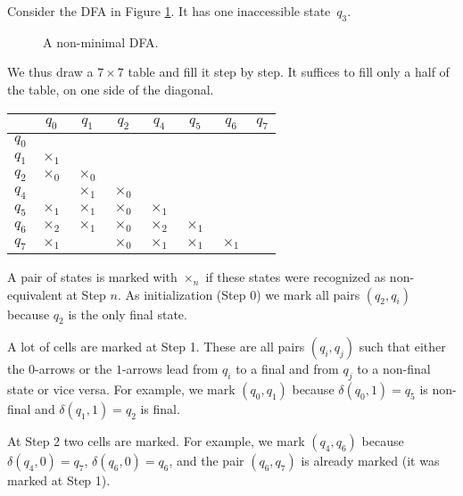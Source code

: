 \begin{exl}
Consider the DFA in Figure \ref{fig:DFAMinim}.
It has one inaccessible state~$q_3$.

\begin{figure}[ht]
\begin{center}

\end{center}
\caption{A non-minimal DFA.}
\label{fig:DFAMinim}
\end{figure}

We thus draw a $7 \times 7$ table and fill it step by step.
It suffices to fill only a half of the table, on one side of the diagonal.

\renewcommand{\arraystretch}{1.7}
\begin{center}
\begin{tabular}{c|c|c|c|c|c|c|c|}
& $q_0$ & $q_1$ & $q_2$ & $q_4$ & $q_5$ & $q_6$ & $q_7$\\\hline
$q_0$ & \cellcolor{lightgray} &&&&&&\\\hline
$q_1$ & $\times_1$ & \cellcolor{lightgray} &&&&&\\\hline
$q_2$ & $\times_0$ & $\times_0$ & \cellcolor{lightgray} &&&&\\\hline
$q_4$ &  & $\times_1$ & $\times_0$ & \cellcolor{lightgray} &&&\\\hline
$q_5$ & $\times_1$ & $\times_1$ & $\times_0$ & $\times_1$ & \cellcolor{lightgray} &&\\\hline
$q_6$ & $\times_2$ & $\times_1$ & $\times_0$ & $\times_2$ & $\times_1$ & \cellcolor{lightgray} &\\\hline
$q_7$ & $\times_1$ &  & $\times_0$ & $\times_1$ & $\times_1$ & $\times_1$ & \cellcolor{lightgray}\\\hline
\end{tabular}
\end{center}

A pair of states is marked with $\times_n$ if these states were recognized as non-equivalent at Step $n$.
As initialization (Step 0) we mark all pairs $(q_2, q_i)$ because $q_2$ is the only final state.

A lot of cells are marked at Step 1.
These are all pairs $(q_i, q_j)$ such that either the $0$-arrows or the $1$-arrows lead from $q_i$ to a final and from $q_j$ to a non-final state or vice versa.
For example, we mark $(q_0, q_1)$ because $\delta(q_0, 1) = q_5$ is non-final and $\delta(q_1, 1) = q_2$ is final.

At Step 2 two cells are marked.
For example, we mark $(q_4, q_6)$ because $\delta(q_4, 0) = q_7$, $\delta(q_6, 0) = q_6$, and the pair $(q_6, q_7)$ is already marked (it was marked at Step 1).


\end{exl}
